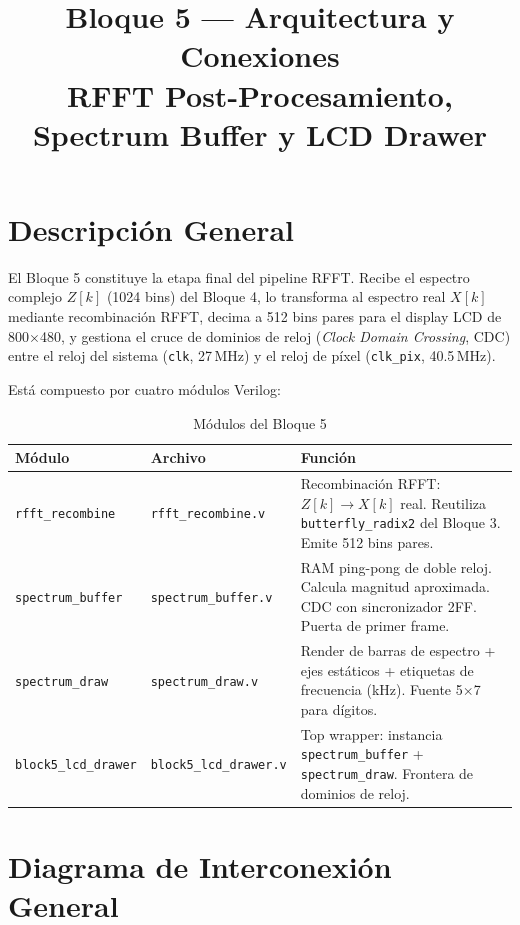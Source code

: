 \documentclass[12pt, a4paper]{article}
\title{\textbf{Bloque 5 — Arquitectura y Conexiones}\\
       \large RFFT Post-Procesamiento, Spectrum Buffer y LCD Drawer}
\author{}
\date{}
\begin{document}
\maketitle
\tableofcontents
\newpage

\section{Descripción General}

El Bloque 5 constituye la etapa final del pipeline RFFT. Recibe el espectro
complejo $Z[k]$ (1024 bins) del Bloque 4, lo transforma al espectro real
$X[k]$ mediante recombinación RFFT, decima a 512 bins pares para el display
LCD de 800$\times$480, y gestiona el cruce de dominios de reloj
(\emph{Clock Domain Crossing}, CDC) entre el reloj del sistema
(\texttt{clk}, 27\,MHz) y el reloj de píxel (\texttt{clk\_pix}, 40.5\,MHz).

Está compuesto por cuatro módulos Verilog:

\begin{table}[H]
\centering
\caption{Módulos del Bloque 5}
\begin{tabular}{p{3.2cm} p{4.5cm} p{7cm}}
\toprule
\textbf{Módulo} & \textbf{Archivo} & \textbf{Función} \\
\midrule
\texttt{rfft\_recombine}  & \texttt{rfft\_recombine.v}  &
  Recombinación RFFT: $Z[k] \rightarrow X[k]$ real. Reutiliza
  \texttt{butterfly\_radix2} del Bloque 3. Emite 512 bins pares. \\
\texttt{spectrum\_buffer} & \texttt{spectrum\_buffer.v} &
  RAM ping-pong de doble reloj. Calcula magnitud aproximada. CDC
  con sincronizador 2FF. Puerta de primer frame. \\
\texttt{spectrum\_draw}   & \texttt{spectrum\_draw.v}   &
  Render de barras de espectro + ejes estáticos + etiquetas de
  frecuencia (kHz). Fuente 5$\times$7 para dígitos. \\
\texttt{block5\_lcd\_drawer} & \texttt{block5\_lcd\_drawer.v} &
  Top wrapper: instancia \texttt{spectrum\_buffer} +
  \texttt{spectrum\_draw}. Frontera de dominios de reloj. \\
\bottomrule
\end{tabular}
\end{table}

\section{Diagrama de Interconexión General}
\end{document}
